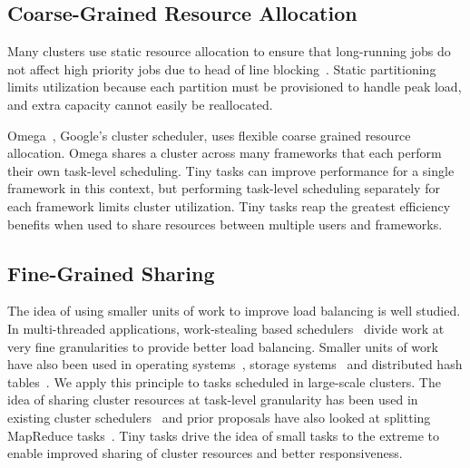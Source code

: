 \subsection{Coarse-Grained Resource Allocation}
Many clusters use static resource allocation to ensure that long-running jobs do not
affect high priority jobs due to head of line blocking~\cite{thusoo2010data}.
Static partitioning limits utilization because each
partition must be provisioned to handle peak load, and extra capacity cannot
easily be reallocated.


Omega~\cite{wilkes2013omega}, Google's cluster scheduler, uses flexible coarse
grained resource allocation. Omega shares a cluster across many frameworks that
each perform their own task-level scheduling. Tiny tasks can improve performance
for a single framework in this context, but performing task-level scheduling
separately for each framework limits cluster utilization.
Tiny tasks reap the greatest efficiency benefits when used to share resources
between multiple users and frameworks.
\subsection{Fine-Grained Sharing}
The idea of using smaller units of work to improve load balancing is well
studied.  In multi-threaded applications, work-stealing
based schedulers~\cite{blumofe1994scheduling} divide work at very fine granularities to provide better load
balancing.  Smaller units of work have also been used in
operating systems~\cite{sherman1972trace}, storage systems~\cite{chang2008bigtable,ghemawat2003google} and distributed hash tables~\cite{stoica2001chord}. We apply this
principle to tasks scheduled in large-scale clusters.  The
idea of sharing cluster resources at task-level granularity has been used in
existing cluster schedulers~\cite{hindman2011mesos, zaharia2010delay} and prior
proposals have also looked at splitting MapReduce tasks~\cite{bhatotia2011incoop}.
Tiny tasks drive the idea of small tasks to the extreme to enable improved
sharing of cluster resources
and better responsiveness.

